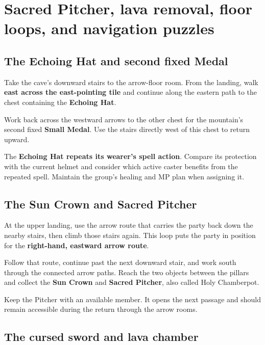\section{Sacred Pitcher, lava removal, floor loops, and navigation puzzles}

\subsection*{The Echoing Hat and second fixed Medal}

Take the cave's downward stairs to the arrow-floor room.
From the landing, walk \textbf{east across the east-pointing tile}
and continue along the eastern path to the chest containing
the \textbf{Echoing Hat}.

Work back across the westward arrows to the other chest
for the mountain's second fixed \textbf{Small Medal}.
Use the stairs directly west of this chest to return upward.

The \textbf{Echoing Hat repeats its wearer's spell action}.
Compare its protection with the current helmet and consider
which active caster benefits from the repeated spell.
Maintain the group's healing and MP plan when assigning it.

\subsection*{The Sun Crown and Sacred Pitcher}

At the upper landing, use the arrow route that carries the
party back down the nearby stairs, then climb those stairs
again. This loop puts the party in position for the
\textbf{right-hand, eastward arrow route}.

Follow that route, continue past the next downward stair,
and work south through the connected arrow paths. Reach
the two objects between the pillars and collect the
\textbf{Sun Crown} and \textbf{Sacred Pitcher}, also
called Holy Chamberpot.


Keep the Pitcher with an available member. It opens the
next passage and should remain accessible during the return
through the arrow rooms.

\subsection*{The cursed sword and lava chamber}

